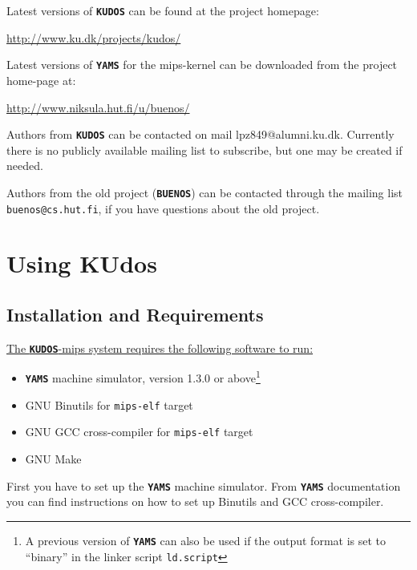 \documentclass[twoside,a4paper]{report}
\newcommand{\buenos}{\texttt{\textbf{BUENOS}}}
\newcommand{\kudos}{\texttt{\textbf{KUDOS}}}
\newcommand{\yams}{\texttt{\textbf{YAMS}}}
\begin{document}
Latest versions of \kudos{} can be found at the project homepage:

\vspace{\baselineskip}
\url{http://www.ku.dk/projects/kudos/}
\vspace{\baselineskip}

Latest versions of \yams{} for the mips-kernel can be downloaded from the
project home-page at:

\vspace{\baselineskip}
\url{http://www.niksula.hut.fi/u/buenos/}
\vspace{\baselineskip}

Authors from \kudos{} can be contacted on mail lpz849@alumni.ku.dk.
Currently there is no publicly available mailing list to subscribe,
but one may be created if needed.

Authors from the old project (\buenos{}) can be contacted through the
mailing list \texttt{buenos@cs.hut.fi}, if you have questions about the old
project.

\chapter{Using KUdos}
\label{sec:usage}

\section{Installation and Requirements}
\label{sec:install}

\underline{The \kudos{}-mips system requires the following software to run:}
\begin{itemize}
\item \yams{} machine simulator, version 1.3.0 or above\footnote{A
previous version of \yams{} can also be used if the output format is
set to ``binary'' in the linker script \texttt{ld.script}}
\item GNU Binutils for \texttt{mips-elf} target
\item GNU GCC cross-compiler for \texttt{mips-elf} target
\item GNU Make
\end{itemize}

First you have to set up the \yams{} machine simulator. From \yams{}
documentation you can find instructions on how to set up Binutils and
GCC cross-compiler.
\end{document}
